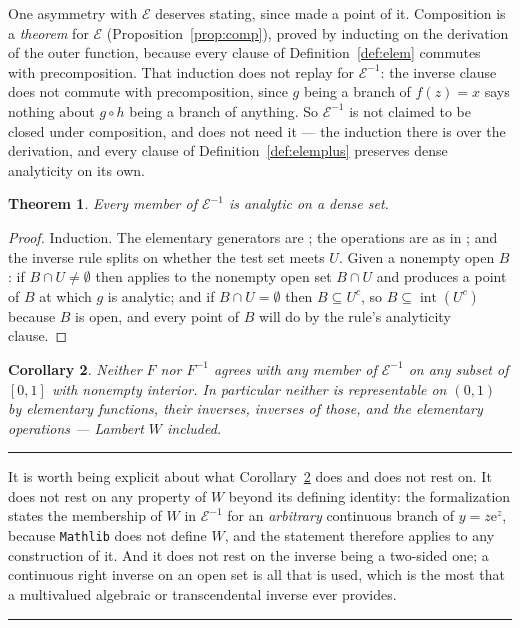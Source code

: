 \documentclass[11pt,oneside]{article}
\newtheorem{theorem}{Theorem}[section]
\newtheorem{corollary}[theorem]{Corollary}
\theoremstyle{definition}
\theoremstyle{remark}
\newcommand{\e}{\mathrm e}
\newcommand{\Elem}{\mathcal E}
\newenvironment{boxedremark}{%
  \par\smallskip\noindent\begin{center}\begin{minipage}{0.94\textwidth}%
  \color{black}\hrule\vspace{0.6em}\small
}{%
  \vspace{0.6em}\hrule\end{minipage}\end{center}\smallskip
}
\begin{document}
One asymmetry with $\Elem$ deserves stating, since  made a
point of it.  Composition is a \emph{theorem} for $\Elem$
(Proposition~\ref{prop:comp}), proved by inducting on the derivation of the
outer function, because every clause of Definition~\ref{def:elem} commutes with
precomposition.  That induction does not replay for $\Elem^{-1}$: the inverse
clause does not commute with precomposition, since $g$ being a branch of
$f(z)=x$ says nothing about $g\circ h$ being a branch of anything.  So
$\Elem^{-1}$ is not claimed to be closed under composition, and
 does not need it --- the induction there is over the
derivation, and every clause of Definition~\ref{def:elemplus} preserves dense
analyticity on its own.

\begin{theorem}\label{thm:plusdense}
Every member of $\Elem^{-1}$ is analytic on a dense set.
\end{theorem}

\begin{proof}
Induction.  The elementary generators are ; the operations
are as in ; and the inverse rule splits on whether the test
set meets $U$.  Given a nonempty open $B$: if $B\cap U\ne\emptyset$ then
 applies to the nonempty open set $B\cap U$ and produces a
point of $B$ at which $g$ is analytic; and if $B\cap U=\emptyset$ then
$B\subseteq U^{c}$, so $B\subseteq\operatorname{int}(U^{c})$ because $B$ is
open, and every point of $B$ will do by the rule's analyticity clause.
\end{proof}

\begin{corollary}\label{cor:plusmain}
Neither $F$ nor $F^{-1}$ agrees with any member of $\Elem^{-1}$ on any subset
of $[0,1]$ with nonempty interior.  In particular neither is representable on
$(0,1)$ by elementary functions, their inverses, inverses of those, and the
elementary operations --- Lambert $W$ included.
\end{corollary}

\begin{boxedremark}
It is worth being explicit about what Corollary~\ref{cor:plusmain} does and does not
rest on.  It does not rest on any property of $W$ beyond its defining
identity: the formalization states the membership of $W$ in $\Elem^{-1}$ for
an \emph{arbitrary} continuous branch of $y=z\e^{z}$, because \texttt{Mathlib}
does not define $W$, and the statement therefore applies to any construction
of it.  And it does not rest on the inverse being a two-sided one; a
continuous right inverse on an open set is all that is used, which is the most
that a multivalued algebraic or transcendental inverse ever provides.
\end{boxedremark}
\end{document}
